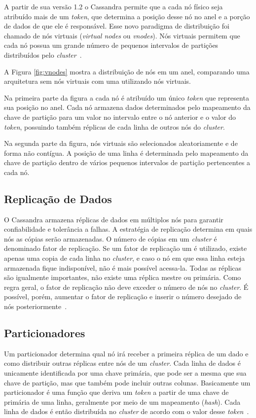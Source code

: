 A partir de sua versão 1.2 o Cassandra permite que a cada nó físico seja atribuído mais de um \emph{token}, que determina a posição desse nó no anel e a porção de dados de que ele é responsável. Esse novo paradigma de distribuição foi chamado de nós virtuais (\emph{virtual nodes} ou \emph{vnodes}).
Nós virtuais permitem que cada nó possua um grande número de pequenos intervalos de partições distribuídos pelo \emph{cluster}~\cite{cassandravnodes}.

A Figura \ref{fig:vnodes} mostra a distribuição de nós em um anel, comparando uma arquitetura sem nós virtuais com uma utilizando nós virtuais. 

Na primeira parte da figura a cada nó é atribuído um único \emph{token} que representa sua posição no anel. Cada nó armazena dados determinados pelo mapeamento da chave de partição para um valor no intervalo entre o nó anterior e o valor do \emph{token}, possuindo também réplicas de cada linha de outros nós do \emph{cluster}. 

Na segunda parte da figura, nós virtuais são selecionados aleatoriamente e de forma não contígua. A posição de uma linha é determinada pelo mapeamento da chave de partição dentro de vários pequenos intervalos de partição pertencentes a cada nó.



\subsection*{Replicação de Dados}
O Cassandra armazena réplicas de dados em múltiplos nós para garantir confiabilidade e tolerância a falhas. A estratégia de replicação determina em quais nós as cópias serão armazenadas. O número de cópias em um \emph{cluster} é denominado fator de replicação. Se um fator de replicação um é utilizado, existe apenas uma copia de cada linha no \emph{cluster}, e caso o nó em que essa linha esteja armazenada fique indisponível, não é mais possível acessa-la. Todas as réplicas são igualmente importantes, não existe uma réplica mestre ou primária. Como regra geral, o fator de replicação não deve exceder o número de nós no \emph{cluster}. É possível, porém, aumentar o fator de replicação e inserir o número desejado de nós posteriormente~\cite{cassandradocs}.

\subsection*{Particionadores}
Um particionador determina qual nó irá receber a primeira réplica de um dado e como distribuir outras réplicas entre nós de um \emph{cluster}. Cada linha de dados é unicamente identificada por uma chave primária, que pode ser a mesma que sua chave de partição, mas que também pode incluir outras colunas. Basicamente um particionador é uma função que deriva um \emph{token} a partir de uma chave de primária de uma linha, geralmente por meio de um mapeamento (\emph{hash}). Cada linha de dados é então distribuída no \emph{cluster} de acordo com o valor desse \emph{token}~\cite{cassandradocs}. 

